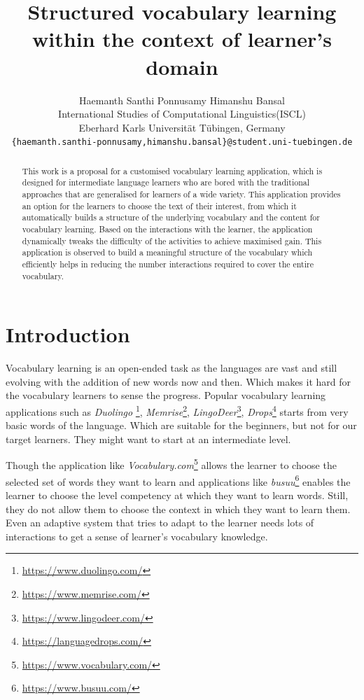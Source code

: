 \documentclass[11pt,a4paper]{article}
\title{Structured vocabulary learning within the context of learner's domain}
\author{Haemanth Santhi Ponnusamy \qquad Himanshu Bansal \\
  International Studies of Computational Linguistics(ISCL) \\
  Eberhard Karls Universität Tübingen, 
  Germany \\ \tt \small \{haemanth.santhi-ponnusamy,himanshu.bansal\}@student.uni-tuebingen.de}
\date{}
\begin{document}
\maketitle
\begin{abstract}
 This work is a proposal for a customised vocabulary learning application, which is designed for intermediate language learners who are bored with the traditional approaches that are generalised for learners of a wide variety. This application provides an option for the learners to choose the text of their interest, from which it automatically builds a structure of the underlying vocabulary and the content for vocabulary learning. Based on the interactions with the learner, the application dynamically tweaks the difficulty of the activities to achieve maximised gain. This application is observed to build a meaningful structure of the vocabulary which efficiently helps in reducing the number interactions required to cover the entire vocabulary.
\end{abstract}

\section{Introduction}

Vocabulary learning is an open-ended task as the languages are vast and still
evolving with the addition of new words now and then. Which makes it hard for the vocabulary learners to sense the progress. Popular vocabulary learning applications such as \textit{Duolingo} \footnote{\url{https://www.duolingo.com/}}, \textit{Memrise}\footnote{\url{https://www.memrise.com/}}, \textit{LingoDeer}\footnote{\url{https://www.lingodeer.com/}}, \textit{Drops}\footnote{\url{https://languagedrops.com/}} starts from very basic words of the language. Which are suitable for the beginners, but not for our target learners. They might want to start at an intermediate level. 

Though the application like \textit{Vocabulary.com}\footnote{\url{https://www.vocabulary.com/}} allows the learner to choose the selected set of words they want to learn and applications like \textit{busuu}\footnote{\url{https://www.busuu.com/}} enables the learner to choose the level competency at which they want to learn words. Still, they do not allow them to choose the context in which they want to learn them. Even an adaptive system that tries to adapt to the learner needs lots of interactions to get a sense of learner's vocabulary knowledge.
\end{document}
